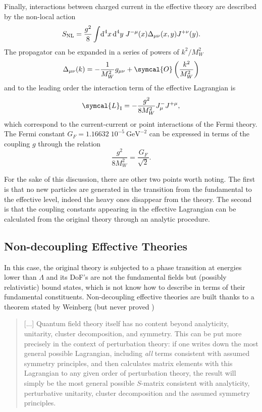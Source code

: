 Finally, interactions between charged current in the effective theory are described by the non-local action
\begin{equation}
  S_\text{NL} = \frac{g^2}{8} \int \! \operatorname{d}^4 \! x \operatorname{d}^4 \! y \; J^{- \mu}(x) \Delta_{\mu \nu}(x, y) J^{+ \nu}(y) .
\end{equation}
The propagator can be expanded in a series of powers of $k^2/M^2_W$
\begin{equation}
  \Delta_{\mu \nu}(k) = - \frac{1}{M^2_W} g_{\mu \nu} + \symcal{O}\left( \frac{k^2}{M^2_W} \right)
\end{equation}
and to the leading order the interaction term of the effective Lagrangian is
\begin{equation}
  \symcal{L}_\text{I} = - \frac{g^2}{8 M^2_W} J^-_\mu J^{+ \mu} ,
\end{equation}
which correspond to the current-current or point interactions of the Fermi theory. The Fermi constant $G_F=1.16632 \; 10^{-5} \ \text{GeV}^{-2}$ can be expressed in terms of the coupling $g$ through the relation 
\begin{equation}
  \frac{g^2}{8M_W^2}=\frac{G_F}{\sqrt{2}} .
\end{equation}

For the sake of this discussion, there are other two points worth noting. The first is that no new particles are generated in the transition from the fundamental to the effective level, indeed the heavy ones disappear from the theory. The second is that the coupling constants appearing in the effective Lagrangian can be calculated from the original theory through an analytic procedure.

\subsection{Non-decoupling Effective Theories} 

In this case, the original theory is subjected to a phase transition at energies lower than $\Lambda$ and its DoF's are not the fundamental fields but (possibly relativistic) bound states, which is not know how to describe in terms of their fundamental constituents. Non-decoupling effective theories are built thanks to a theorem stated by Weinberg (but never proved \cite{Weinberg:1978kz})
\begin{quote}
  [...] Quantum field theory itself has no content beyond analyticity, unitarity, cluster decomposition, and symmetry. This can be put more precisely in the context of perturbation theory: if one writes down the most general possible Lagrangian, including \emph{all} terms consistent with assumed symmetry principles, and then calculates matrix elements with this Lagrangian to any given order of perturbation theory, the result will simply be the most general possible $S$-matrix consistent with analyticity, perturbative unitarity, cluster decomposition and the assumed symmetry principles.
\end{quote}

